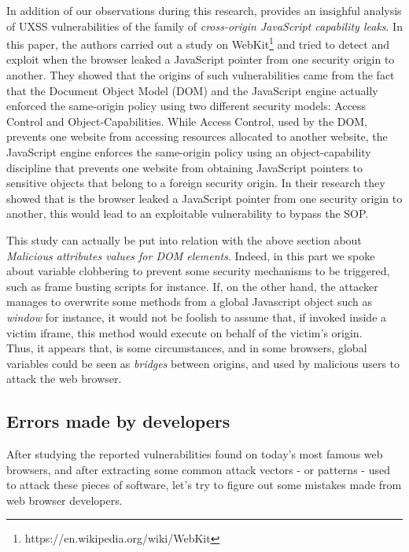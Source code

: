 \documentclass[journal]{IEEEtran}
\begin{document}
\bigskip

In addition of our observations during this research, \cite{uxssJSLeaks} provides an insighful analysis of UXSS vulnerabilities of the family of \emph{cross-origin JavaScript capability leaks}. In this paper, the authors carried out a study on WebKit\footnote{https://en.wikipedia.org/wiki/WebKit} and tried to detect and exploit when the browser leaked a JavaScript pointer from one security origin to another. They showed that the origins of such vulnerabilities came from the fact that the Document Object Model (DOM) and the JavaScript engine actually enforced the same-origin policy using two different security models: Access Control and Object-Capabilities. While Access Control, used by the DOM, prevents one website from accessing resources allocated to another website, the JavaScript engine enforces the same-origin policy using an object-capability discipline that prevents one website from obtaining JavaScript pointers to sensitive objects that belong to a foreign security origin. In their research they showed that is the browser leaked a JavaScript pointer from one security origin to another, this would lead to an exploitable vulnerability to bypass the SOP. 

\medskip

This study can actually be put into relation with the above section about \emph{Malicious attributes values for DOM elements}. Indeed, in this part we spoke about variable clobbering to prevent some security mechanisms to be triggered, such as frame busting scripts for instance. If, on the other hand, the attacker manages to overwrite some methods from a global Javascript object such as \emph{window} for instance, it would not be foolish to assume that, if invoked inside a victim iframe, this method would execute on behalf of the victim's origin. \\

Thus, it appears that, is some circumstances, and in some browsers, global variables could be seen as \emph{bridges} between origins, and used by malicious users to attack the web browser.


\subsection{Errors made by developers}

After studying the reported vulnerabilities found on today's most famous web browsers, and after extracting some common attack vectors - or patterns - used to attack these pieces of software, let's try to figure out some mistakes made from web browser developers.
\end{document}
